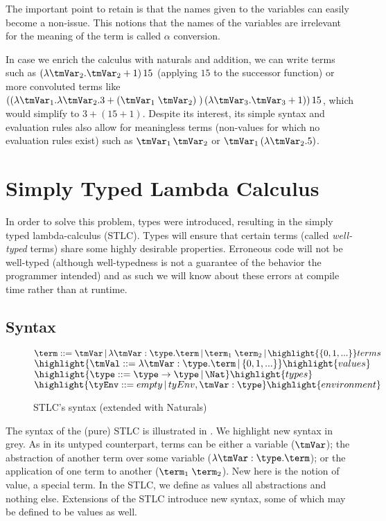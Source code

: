 The important point to retain is that the names given to the variables can easily become a non-issue. This notions that the names of the variables are irrelevant for the meaning of the term is called $\alpha$ conversion.

In case we enrich the calculus with naturals and addition, we can write terms such as $(\lambda \tmVar_2.\tmVar_2 + 1)\,15$ (applying $15$ to the successor function) or more convoluted terms like $((\lambda \tmVar_1. \lambda \tmVar_2 .3 + (\tmVar_1\;\tmVar_2)\;) \, (\lambda \tmVar_3.\tmVar_3 + 1))\,15$, which would simplify to $3+(15+1)$. Despite its interest, its simple syntax and evaluation rules also allow for meaningless terms (non-values for which no evaluation rules exist) such as $\tmVar_1 \, \tmVar_2$ or $\tmVar_1 \, (\lambda \tmVar_2.5)$.

\section{Simply Typed Lambda Calculus}
In order to solve this problem, types were introduced, resulting in the simply typed lambda-calculus (STLC). Types will ensure that certain terms (called \textit{well-typed} terms) share some highly desirable properties. Erroneous code will not be well-typed (although well-typedness is not a guarantee of the behavior the programmer intended) and as such we will know about these errors at compile time rather than at runtime.
\subsection{Syntax}
\begin{figure}
  $\term ::= \tmVar\,|\,\lambda \tmVar:\type.\term\,|\,\term_1 \; \term_2 \,|\, \highlight{\{0,1,...\}} \hfill terms $\\
  $\highlight{\tmVal::= \lambda \tmVar:\type.\term \,|\, \{0,1,...\}} \hfill \highlight{values}$\\
  $\highlight{\type ::= \type \rightarrow \type \,|\,\Nat} \hfill \highlight{types}$\\
  $\highlight{\tyEnv::=  empty \,|\, tyEnv, \tmVar:\type} \hfill \highlight{environment}$\\
    \caption{STLC's syntax (extended with Naturals)}
  \label{STLC syntax}
\end{figure}

The syntax of the (pure) STLC is illustrated in . We highlight new syntax in grey. As in its untyped counterpart, terms can be either a variable ($\tmVar$); the abstraction of another term over some variable ($\lambda \tmVar : \type . \term$); or the application of one term to another ($\term_1 \; \term_2$). New here is the notion of value, a special term. In the STLC, we define as values all abstractions and nothing else. Extensions of the STLC introduce new syntax, some of which may be defined to be values as well.

